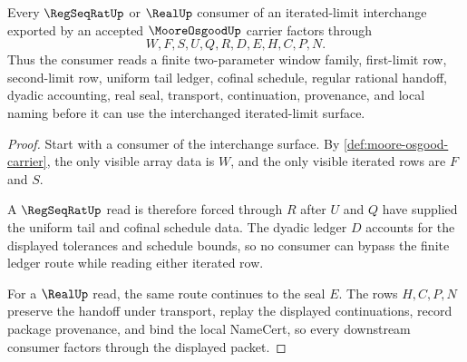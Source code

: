 \begin{theorem}\label{thm:moore-osgood-iterated-limit-handoff}
Every $\RegSeqRatUp$ or $\RealUp$ consumer of an iterated-limit interchange exported by an accepted $\MooreOsgoodUp$ carrier factors through
$$
W,F,S,U,Q,R,D,E,H,C,P,N.
$$
Thus the consumer reads a finite two-parameter window family, first-limit row, second-limit row, uniform tail ledger, cofinal schedule, regular rational handoff, dyadic accounting, real seal, transport, continuation, provenance, and local naming before it can use the interchanged iterated-limit surface.
\end{theorem}
\begin{proof}
Start with a consumer of the interchange surface. By \autoref{def:moore-osgood-carrier}, the only visible array data is $W$, and the only visible iterated rows are $F$ and $S$.

A $\RegSeqRatUp$ read is therefore forced through $R$ after $U$ and $Q$ have supplied the uniform tail and cofinal schedule data. The dyadic ledger $D$ accounts for the displayed tolerances and schedule bounds, so no consumer can bypass the finite ledger route while reading either iterated row.

For a $\RealUp$ read, the same route continues to the seal $E$. The rows $H,C,P,N$ preserve the handoff under transport, replay the displayed continuations, record package provenance, and bind the local NameCert, so every downstream consumer factors through the displayed packet.
\end{proof}

